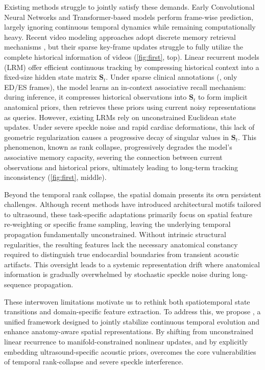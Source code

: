 Existing methods struggle to jointly satisfy these demands.
Early Convolutional Neural Networks \cite{MICCAI15_UNet,long2015fully} and Transformer-based models \cite{NIPS17_Attention,ICLR21_vit,TMI24_DSA} perform frame-wise prediction, largely ignoring continuous temporal dynamics while remaining computationally heavy.
Recent video modeling approaches adopt discrete memory retrieval mechanisms \cite{iccv19_stm,neurips21_stm,eccv22_xmem,iccv25_xmempp,cvpr24_cutie,ICLR25_SAM2,CVPR25_DAM,deng2024memsam,MICCAI25_SAMed2}, but their sparse key-frame updates struggle to fully utilize the complete historical information of videos (\cref{fig:first}, top).
Linear recurrent models (LRM) \cite{katharopoulos_transformers_2020,ICML20_ttt,ICML21_fwp,ICLR25_gdn,ICLR26_ttt_LaCT} offer efficient continuous tracking by compressing historical context into a fixed-size hidden state matrix $\mathbf{S}_t$.
Under sparse clinical annotations (\eg, only ED/ES frames), the model learns an in-context associative recall mechanism: during inference, it compresses historical observations into $\mathbf{S}_t$ to form implicit anatomical priors, then retrieves these priors using current noisy representations as queries.
However, existing LRMs rely on unconstrained Euclidean state updates.
Under severe speckle noise and rapid cardiac deformations, this lack of geometric regularization causes a progressive decay of singular values in $\mathbf{S}_t$.
This phenomenon, known as rank collapse, progressively degrades the model's associative memory capacity, severing the connection between current observations and historical priors, ultimately leading to long-term tracking inconsistency (\cref{fig:first}, middle).

Beyond the temporal rank collapse, the spatial domain presents its own persistent challenges.
Although recent methods \cite{deng2024memsam,mm25_echovim,ICCV25_gdkvm} have introduced architectural motifs tailored to ultrasound, these task-specific adaptations primarily focus on spatial feature re-weighting or specific frame sampling, leaving the underlying temporal propagation fundamentally unconstrained.
Without intrinsic structural regularities, the resulting features lack the necessary anatomical constancy required to distinguish true endocardial boundaries from transient acoustic artifacts.
This oversight leads to a systemic representation drift where anatomical information is gradually overwhelmed by stochastic speckle noise during long-sequence propagation.

These interwoven limitations motivate us to rethink both spatiotemporal state transitions and domain-specific feature extraction.
To address this, we propose \textbf{\mymodel}, a unified framework designed to jointly stabilize continuous temporal evolution and enhance anatomy-aware spatial representations.
By shifting from unconstrained linear recurrence to manifold-constrained nonlinear updates, and by explicitly embedding ultrasound-specific acoustic priors, \mymodel overcomes the core vulnerabilities of temporal rank-collapse and severe speckle interference.


